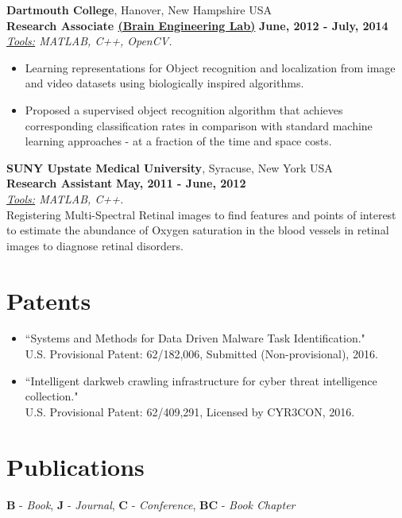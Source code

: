\documentclass[margin,line]{CV}
\begin{document}
\begin{resume}
\begin{enumerate}
\end{enumerate}

{\bf Dartmouth College}, Hanover, New Hampshire USA\\
{\bf Research Associate \href{https://www.dartmouth.edu/~rhg/}{(Brain Engineering Lab)}} \hfill {\bf June, 2012 - July, 2014}\\
\textit{\underline{Tools:} MATLAB, C++, OpenCV.}
\begin{itemize}
	\item Learning representations for Object recognition and localization from image and video datasets using biologically inspired algorithms.
	\item Proposed a supervised object recognition algorithm that achieves corresponding classification rates in comparison with standard machine learning approaches - at a fraction of the time and space costs.
\end{itemize}
 

{\bf SUNY Upstate Medical University}, Syracuse, New York USA\\
{\bf Research Assistant} \hfill {\bf May, 2011 - June, 2012}\\
\textit{\underline{Tools:} MATLAB, C++.}\\
Registering Multi-Spectral Retinal images to find features and points of interest to estimate the abundance of Oxygen saturation in the blood vessels in retinal images to diagnose retinal disorders.

\section{\sc Patents}
\begin{itemize}[leftmargin =*]

\item ``Systems and Methods for Data Driven Malware Task Identification." \\U.S. Provisional Patent: 62/182,006, Submitted (Non-provisional), 2016. 

\item ``Intelligent darkweb crawling infrastructure for cyber threat intelligence collection."\\U.S. Provisional Patent: 62/409,291, Licensed by CYR3CON, 2016.
\end{itemize}


\section{\sc Publications}
{\bf *B} - {\em Book}, {\bf*J} - {\em Journal}, {\bf *C} - {\em Conference}, {\bf*BC} - {\em Book Chapter}\\


\end{resume}
\end{document}
